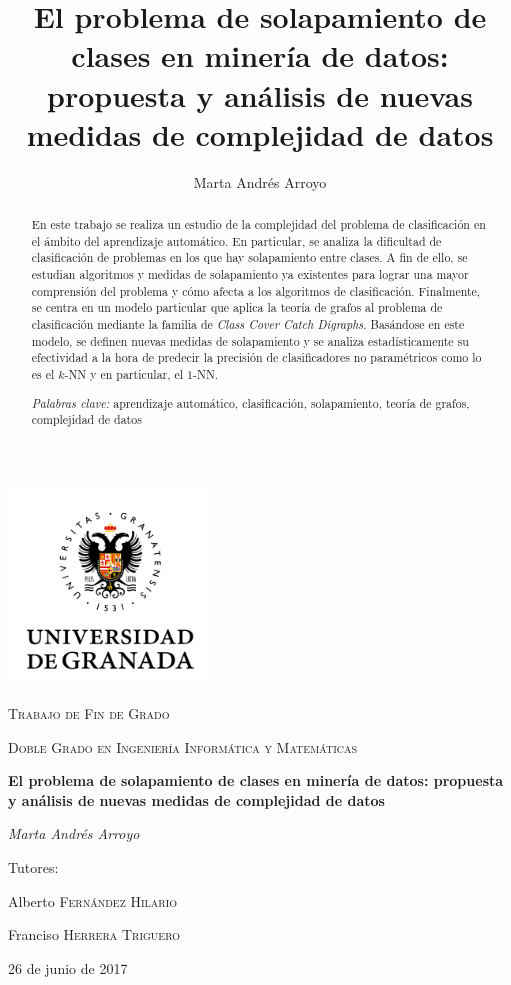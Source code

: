 \documentclass[a4paper,12pt]{report}
\title{El problema de solapamiento de clases en minería de datos: propuesta y análisis de nuevas medidas de complejidad de datos}
\author{Marta Andrés Arroyo}
\date{}
\theoremstyle{definition}
\begin{document}

\begin{titlepage}
  \centering
  \includegraphics[width=0.4\textwidth]{imgs/logo_UGR}
  \par\vspace{0.5cm}
  {\scshape\Large Trabajo de Fin de Grado \par}
  \vspace{0.5cm}
  {\scshape\large Doble Grado en Ingeniería Informática y Matemáticas\par}
  \vspace{1cm}
  {\Large\bfseries El problema de solapamiento de clases en minería de datos: propuesta y análisis de nuevas medidas de complejidad de datos\par}
  \vspace{0.5cm}
  {\Large\itshape Marta Andrés Arroyo\par}
  \vfill
  Tutores:\par
  Alberto \textsc{Fernández Hilario}\par
  Franciso \textsc{Herrera Triguero}

  \vfill

  {\large 26 de junio de 2017\par}
\end{titlepage}

\begin{abstract}
  En este trabajo se realiza un estudio de la complejidad del problema de clasificación en el ámbito del aprendizaje automático. En particular, se analiza la dificultad de clasificación de problemas en los que hay solapamiento entre clases. A fin de ello, se estudian algoritmos y medidas de solapamiento ya existentes para lograr una mayor comprensión del problema y cómo afecta a los algoritmos de clasificación. Finalmente, se centra en un modelo particular que aplica la teoría de grafos al problema de clasificación mediante la familia de \emph{Class Cover Catch Digraphs}. Basándose en este modelo, se definen nuevas medidas de solapamiento y se analiza estadísticamente su efectividad a la hora de predecir la precisión de clasificadores no paramétricos como lo es el $k$-NN y en particular, el $1$-NN.

  \medskip
  \emph{Palabras clave:} aprendizaje automático, clasificación, solapamiento, teoría de grafos, complejidad de datos
\end{abstract}
\pagebreak
\end{document}
